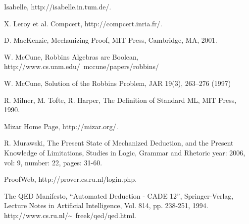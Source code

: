 \documentclass{llncs}
\begin{document}
\begin{thebibliography}{A}
 Isabelle, http://isabelle.in.tum.de/.


 X. Leroy et al.  Compcert, http://compcert.inria.fr/.

 D. MacKenzie, Mechanizing Proof, MIT Press, Cambridge, MA,
2001.

 W. McCune, Robbins Algebras are Boolean, http://www.cs.unm.edu/~mccune/papers/robbins/

 W. McCune, Solution of the Robbins Problem, JAR 19(3), 263--276 (1997)

 R. Milner, M. Tofte, R. Harper, The Definition of Standard ML, MIT Press, 1990.

 Mizar Home Page, http://mizar.org/.

 R. Murawski, The Present State of Mechanized
Deduction, and the Present Knowledge of Limitations,
Studies in Logic, Grammar and Rhetoric 
year: 2006, vol: 9, number: 22, pages: 31-60.


 ProofWeb, http://prover.cs.ru.nl/login.php.

 The QED Manifesto, ``Automated Deduction - CADE 12'', Springer-Verlag, Lecture Notes in Artificial Intelligence, Vol. 814, pp. 238-251, 1994.
http://www.cs.ru.nl/\~~freek/qed/qed.html.

\end{thebibliography}
\end{document}

